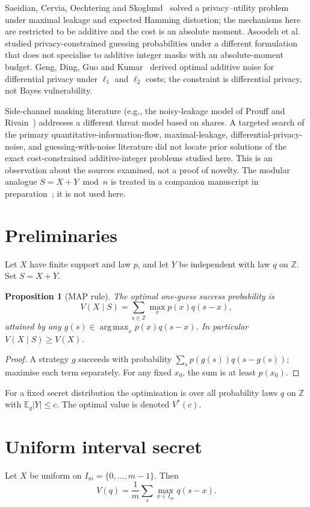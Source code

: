 \documentclass{article}
\DeclareMathOperator*{\argmax}{arg\,max}
\newtheorem{proposition}[theorem]{Proposition}
\theoremstyle{definition}
\theoremstyle{remark}
\newcommand{\Z}{\mathbb{Z}}
\newcommand{\E}{\mathbb{E}}
\begin{document}
Saeidian, Cervia, Oechtering and Skoglund~\cite{SCOS21} solved a privacy--utility problem under maximal leakage and expected Hamming distortion; the mechanisms here are restricted to be additive and the cost is an absolute moment. Asoodeh et al.~\cite{Asoodeh17} studied privacy-constrained guessing probabilities under a different formulation that does not specialise to additive integer masks with an absolute-moment budget. Geng, Ding, Guo and Kumar~\cite{GDGK19} derived optimal additive noise for differential privacy under \(\ell_1\) and \(\ell_2\) costs; the constraint is differential privacy, not Bayes vulnerability.

Side-channel masking literature (e.g., the noisy-leakage model of Prouff and Rivain~\cite{PR13}) addresses a different threat model based on shares. A targeted search of the primary quantitative-information-flow, maximal-leakage, differential-privacy-noise, and guessing-with-noise literature did not locate prior solutions of the exact cost-constrained additive-integer problems studied here. This is an observation about the sources examined, not a proof of novelty. The modular analogue \(S=X+Y\bmod n\) is treated in a companion manuscript in preparation~\cite{Pmod}; it is not used here.

\section{Preliminaries}
Let \(X\) have finite support and law \(p\), and let \(Y\) be independent with law \(q\) on \(\Z\). Set \(S=X+Y\).

\begin{proposition}[MAP rule]\label{prop:map}
The optimal one-guess success probability is
\[
V(X\mid S)=\sum_{s\in\Z}\max_x p(x)q(s-x),
\]
attained by any \(g(s)\in\argmax_x p(x)q(s-x)\). In particular \(V(X\mid S)\ge V(X)\).
\end{proposition}
\begin{proof}
A strategy \(g\) succeeds with probability \(\sum_s p(g(s))q(s-g(s))\); maximise each term separately. For any fixed \(x_0\), the sum is at least \(p(x_0)\).
\end{proof}

For a fixed secret distribution the optimisation is over all probability laws \(q\) on \(\Z\) with \(\E_q|Y|\le c\). The optimal value is denoted \(V^*(c)\).

\section{Uniform interval secret}
Let \(X\) be uniform on \(I_m=\{0,\dots,m-1\}\). Then
\[
V(q)=\frac1m\sum_s\max_{x\in I_m}q(s-x).
\]
\end{document}
